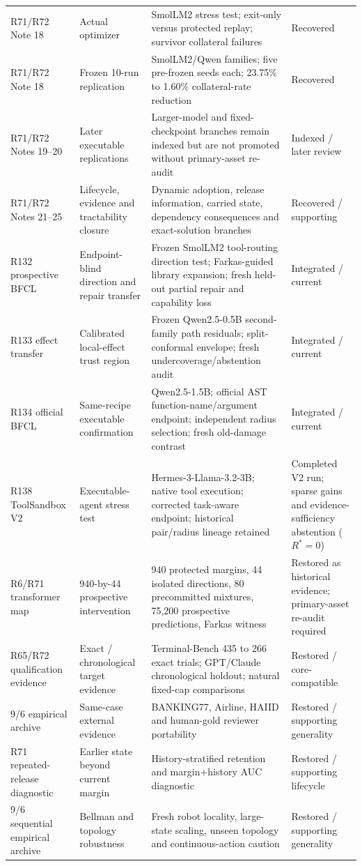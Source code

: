 \documentclass[11pt,letterpaper]{article}
\theoremstyle{plain}
\newcommand{\1}{\mathbf 1}
\begin{document}
\begin{longtable}{p{}p{}p{}p{}}
R71/R72 Note 18 & Actual optimizer & SmolLM2 stress test; exit-only versus protected replay; survivor collateral failures & Recovered\\
R71/R72 Note 18 & Frozen 10-run replication & SmolLM2/Qwen families; five pre-frozen seeds each; 23.75\% to 1.60\% collateral-rate reduction & Recovered\\
R71/R72 Notes 19--20 & Later executable replications & Larger-model and fixed-checkpoint branches remain indexed but are not promoted without primary-asset re-audit & Indexed / later review\\
R71/R72 Notes 21--25 & Lifecycle, evidence and tractability closure & Dynamic adoption, release information, carried state, dependency consequences and exact-solution branches & Recovered / supporting\\
R132 prospective BFCL & Endpoint-blind direction and repair transfer & Frozen SmolLM2 tool-routing direction test; Farkas-guided library expansion; fresh held-out partial repair and capability loss & Integrated / current\\
R133 effect transfer & Calibrated local-effect trust region & Frozen Qwen2.5-0.5B second-family path residuals; split-conformal envelope; fresh undercoverage/abstention audit & Integrated / current\\
R134 official BFCL & Same-recipe executable confirmation & Qwen2.5-1.5B; official AST function-name/argument endpoint; independent radius selection; fresh old-damage contrast & Integrated / current\\
R138 ToolSandbox V2 & Executable-agent stress test & Hermes-3-Llama-3.2-3B; native tool execution; corrected task-aware endpoint; historical pair/radius lineage retained & Completed V2 run; sparse gains and evidence-sufficiency abstention ($R^*=0$)\\
R6/R71 transformer map & 940-by-44 prospective intervention & 940 protected margins, 44 isolated directions, 80 precommitted mixtures, 75,200 prospective predictions, Farkas witness & Restored as historical evidence; primary-asset re-audit required\\
R65/R72 qualification evidence & Exact / chronological target evidence & Terminal-Bench 435 to 266 exact trials; GPT/Claude chronological holdout; natural fixed-cap comparisons & Restored / core-compatible\\
9/6 empirical archive & Same-case external evidence & BANKING77, Airline, HAIID and human-gold reviewer portability & Restored / supporting generality\\
R71 repeated-release diagnostic & Earlier state beyond current margin & History-stratified retention and margin+history AUC diagnostic & Restored / supporting lifecycle\\
9/6 sequential empirical archive & Bellman and topology robustness & Fresh robot locality, large-state scaling, unseen topology and continuous-action caution & Restored / supporting generality\\
\bottomrule
\end{longtable}
\normalsize
\end{document}
